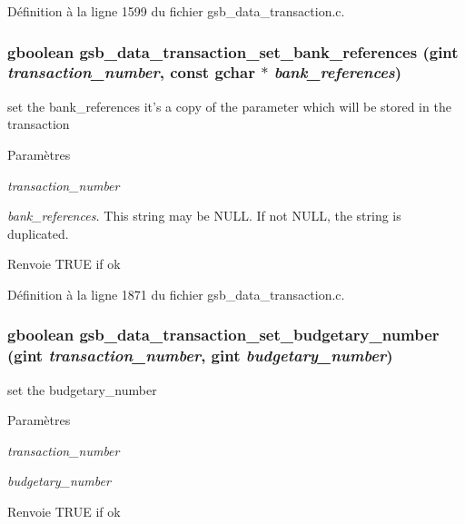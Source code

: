 Définition à la ligne 1599 du fichier gsb\_\-data\_\-transaction.c.

\subsubsection[{gsb\_\-data\_\-transaction\_\-set\_\-bank\_\-references}]{\setlength{\rightskip}{0pt plus 5cm}gboolean gsb\_\-data\_\-transaction\_\-set\_\-bank\_\-references (gint {\em transaction\_\-number}, \/  const gchar $\ast$ {\em bank\_\-references})}\label{gsb__data__transaction_8c_a4e91601dcc725a5ff6a109e4d1dad915}
set the bank\_\-references it's a copy of the parameter which will be stored in the transaction


\begin{DoxyParams}{Paramètres}
\item[{\em transaction\_\-number}]\item[{\em bank\_\-references.}]This string may be NULL. If not NULL, the string is duplicated.\end{DoxyParams}
\begin{DoxyReturn}{Renvoie}
TRUE if ok 
\end{DoxyReturn}


Définition à la ligne 1871 du fichier gsb\_\-data\_\-transaction.c.

\subsubsection[{gsb\_\-data\_\-transaction\_\-set\_\-budgetary\_\-number}]{\setlength{\rightskip}{0pt plus 5cm}gboolean gsb\_\-data\_\-transaction\_\-set\_\-budgetary\_\-number (gint {\em transaction\_\-number}, \/  gint {\em budgetary\_\-number})}\label{gsb__data__transaction_8c_a5cdc1a654e5dbb278af9ad23828fe82d}
set the budgetary\_\-number 
\begin{DoxyParams}{Paramètres}
\item[{\em transaction\_\-number}]\item[{\em budgetary\_\-number}]\end{DoxyParams}
\begin{DoxyReturn}{Renvoie}
TRUE if ok 
\end{DoxyReturn}


